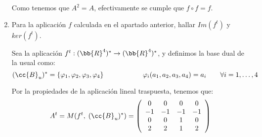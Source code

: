 \documentclass[12pt]{article}
\begin{document}
\begin{ejercicio}
\begin{enumerate}
        Como tenemos que $A^2=A$, efectivamente se cumple que $f\circ f=f$.

        \item Para la aplicación $f$ calculada en el apartado anterior, hallar $Im(f^t)$ y $ker(f^t)$.

        Sea la aplicación $f^t:(\bb{R}^4)^\ast\to (\bb{R}^4)^\ast$, y definimos la base dual de la usual como:
        \begin{equation*}
            (\cc{B}_u)^\ast = \{\varphi_1,\varphi_2,\varphi_3,\varphi_4\} \hspace{2cm} \varphi_i(a_1,a_2,a_3,a_4)=a_i\qquad \forall i=1,\dots,4
        \end{equation*}

        Por la propiedades de la aplicación lineal traspuesta, tenemos que:
        \begin{equation*}
            A^t=M(f^t,\;(\cc{B}_u)^\ast)=\left(\begin{array}{cccc}
                0 & 0 & 0 & 0 \\
                -1 & -1 & -1 & -1 \\
                0 & 0 & 1 & 0 \\
                2 & 2 & 1 & 2 \\
            \end{array}\right)
        \end{equation*}


\end{enumerate}
\end{ejercicio}
\end{document}
